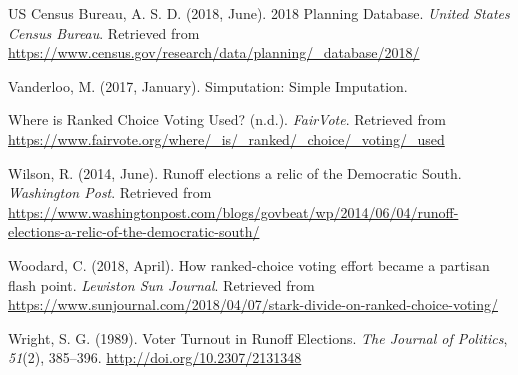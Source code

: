\documentclass[12pt,twoside]{reedthesis}
\begin{document}
\leavevmode\hypertarget{ref-us_census_bureau_2018_2018}{}%
US Census Bureau, A. S. D. (2018, June). 2018 Planning Database. \emph{United States Census Bureau}. Retrieved from \url{https://www.census.gov/research/data/planning/_database/2018/}

\leavevmode\hypertarget{ref-vanderloo_simputation_2017}{}%
Vanderloo, M. (2017, January). Simputation: Simple Imputation.

\leavevmode\hypertarget{ref-noauthor_where_nodate}{}%
Where is Ranked Choice Voting Used? (n.d.). \emph{FairVote}. Retrieved from \url{https://www.fairvote.org/where/_is/_ranked/_choice/_voting/_used}

\leavevmode\hypertarget{ref-wilson_runoff_2014}{}%
Wilson, R. (2014, June). Runoff elections a relic of the Democratic South. \emph{Washington Post}. Retrieved from \url{https://www.washingtonpost.com/blogs/govbeat/wp/2014/06/04/runoff-elections-a-relic-of-the-democratic-south/}

\leavevmode\hypertarget{ref-woodard_how_2018}{}%
Woodard, C. (2018, April). How ranked-choice voting effort became a partisan flash point. \emph{Lewiston Sun Journal}. Retrieved from \url{https://www.sunjournal.com/2018/04/07/stark-divide-on-ranked-choice-voting/}

\leavevmode\hypertarget{ref-wright_voter_1989}{}%
Wright, S. G. (1989). Voter Turnout in Runoff Elections. \emph{The Journal of Politics}, \emph{51}(2), 385--396. \url{http://doi.org/10.2307/2131348}


\end{document}

